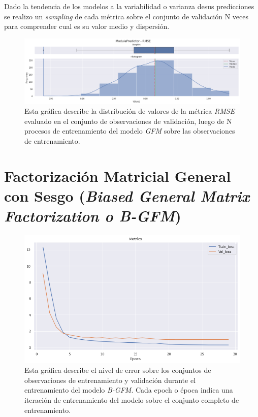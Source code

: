 \documentclass[11pt,a4paper,twoside]{thesis}
\begin{document}
Dado la tendencia de los modelos a la variabilidad o varianza desus
predicciones se realizo un \textit{sampling} de cada métrica sobre el conjunto
de validación N veces para comprender cual es su valor medio y dispersión.

\begin{figure}[h!]
	\centering
	\includegraphics[width=15cm]{./images/metrics-GFM-RMSE.png}
	\caption{Esta gráfica describe la distribución de valores de la métrica
		\textit{RMSE} evaluado en el conjunto de observaciones de validación,
		luego de N procesos de entrenamiento del modelo \textit{GFM} sobre
		las observaciones de entrenamiento.}
\end{figure}

\clearpage

\section{Factorización Matricial General con Sesgo
  (\textit{Biased General Matrix Factorization o B-GFM})}

\begin{figure}[h!]
	\centering
	\includegraphics[width=13cm]{./images/metrics-BGFM-train-val-loss.png}
	\caption{Esta gráfica describe el nivel de error sobre los conjuntos
		de observaciones de entrenamiento y validación durante el entrenamiento
		del modelo \textit{B-GFM}. Cada epoch o época indica una iteración de
		entrenamiento del modelo sobre el conjunto completo de entrenamiento.}
\end{figure}
\end{document}

